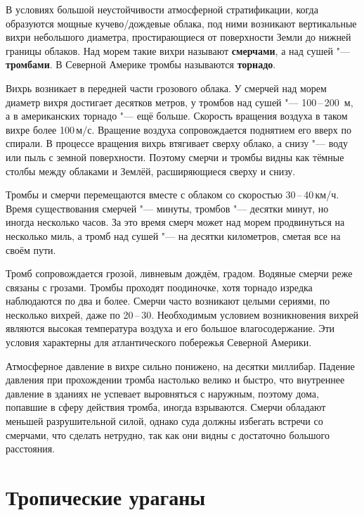 \documentclass[a4paper, 12pt, twoside, final, book, russian, fittopage, cyremdash, openright]{ncc}
\newcommand{\mps}{\,м/с\xspace}
\newcommand{\kph}{\,км/ч\xspace}
\newcommand{\otdo}{\,--\,}
\begin{document}
В условиях большой неустойчивости атмосферной стратификации, когда
образуются мощные кучево\-/дождевые облака, под ними возникают
вертикальные вихри небольшого диаметра, простирающиеся от поверхности
Земли до нижней границы облаков. Над морем такие вихри называют
\textbf{смерчами}, а над сушей "---
\textbf{тромбами}. В Северной Америке тромбы называются
\textbf{торнадо}.

Вихрь возникает в передней части грозового облака. У смерчей над морем
диаметр вихря достигает десятков метров, у тромбов над сушей "---
100\otdo200~м, а в американских торнадо "--- ещё больше. Скорость
вращения воздуха в таком вихре более 100\mps. Вращение воздуха
сопровождается поднятием его вверх по спирали. В процессе вращения
вихрь втягивает сверху облако, а снизу "--- воду или пыль с земной
поверхности. Поэтому смерчи и тромбы видны как тёмные столбы между
облаками и Землёй, расширяющиеся сверху и снизу.

Тромбы и смерчи перемещаются вместе с облаком со скоростью
30\otdo40\kph. Время существования смерчей "--- минуты, тромбов "---
десятки минут, но иногда несколько часов. За это время смерч может над
морем продвинуться на несколько миль, а тромб над сушей "--- на десятки
километров, сметая все на своём пути.

Тромб сопровождается грозой, ливневым дождём, градом. Водяные смерчи
реже связаны с грозами. Тромбы проходят поодиночке, хотя торнадо
изредка наблюдаются по два и более. Смерчи часто возникают целыми
сериями, по несколько вихрей, даже по 20\otdo30. Необходимым условием
возникновения вихрей являются высокая температура воздуха и его
большое влагосодержание. Эти условия характерны для атлантического
побережья Северной Америки.

Атмосферное давление в вихре сильно понижено, на десятки
миллибар. Падение давления при прохождении тромба настолько велико и
быстро, что внутреннее давление в зданиях не успевает выровняться с
наружным, поэтому дома, попавшие в сферу действия тромба, иногда
взрываются. Смерчи обладают меньшей разрушительной силой, однако суда
должны избегать встречи со смерчами, что сделать нетрудно, так как они
видны с достаточно большого расстояния.

\section{Тропические ураганы}
\label{sec:hurricans}
\end{document}
